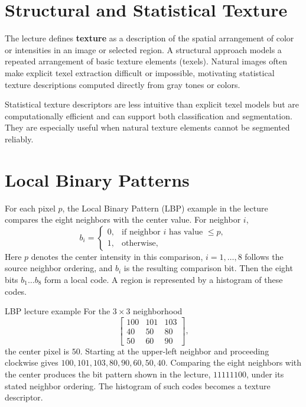 \documentclass[11pt,a4paper,oneside]{report}
\begin{document}
\section{Structural and Statistical Texture}

The lecture defines \textbf{texture} as a description of the spatial arrangement of color or intensities in an image or selected region. A structural approach models a repeated arrangement of basic texture elements (texels). Natural images often make explicit texel extraction difficult or impossible, motivating statistical texture descriptions computed directly from gray tones or colors.

\begin{keyconcept}
Statistical texture descriptors are less intuitive than explicit texel models but are computationally efficient and can support both classification and segmentation. They are especially useful when natural texture elements cannot be segmented reliably.
\end{keyconcept}

\section{Local Binary Patterns}

For each pixel $p$, the Local Binary Pattern (LBP) example in the lecture compares the eight neighbors with the center value. For neighbor $i$,
\begin{equation}
  b_i=\begin{cases}
  0, & \text{if neighbor $i$ has value $\le p$},\\
  1, & \text{otherwise},
  \end{cases}
  \label{eq:lbp-bit}
\end{equation}
Here $p$ denotes the center intensity in this comparison, $i=1,\ldots,8$ follows the source neighbor ordering, and $b_i$ is the resulting comparison bit. Then the eight bits $b_1\ldots b_8$ form a local code. A region is represented by a histogram of these codes.

\begin{examplebox}{LBP lecture example}
For the $3\times3$ neighborhood
{\large
\[
\begin{bmatrix}
100&101&103\\
40&50&80\\
50&60&90
\end{bmatrix},
\]}
the center pixel is $50$. Starting at the upper-left neighbor and proceeding clockwise gives $100,101,103,80,90,60,50,40$. Comparing the eight neighbors with the center produces the bit pattern shown in the lecture, $11111100$, under its stated neighbor ordering. The histogram of such codes becomes a texture descriptor.
\end{examplebox}
\end{document}
